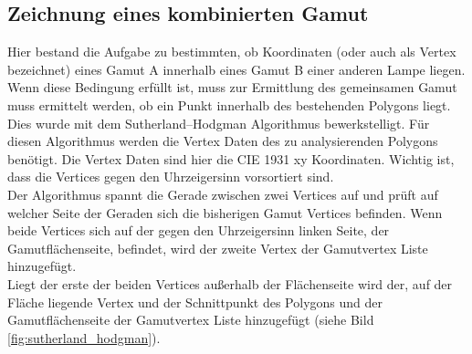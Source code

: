 \documentclass[11pt]{scrartcl}
\begin{document}
\subsection{Zeichnung eines kombinierten Gamut}
Hier bestand die Aufgabe zu bestimmten, ob Koordinaten (oder auch als Vertex bezeichnet) eines Gamut A innerhalb eines Gamut B einer anderen Lampe liegen. Wenn diese
Bedingung erfüllt ist, muss zur Ermittlung des gemeinsamen Gamut muss ermittelt werden, ob ein Punkt innerhalb des bestehenden Polygons liegt. Dies wurde mit dem
Sutherland–Hodgman Algorithmus \cite{sutherlandHodgman} bewerkstelligt. Für diesen Algorithmus werden die Vertex Daten des zu analysierenden Polygons benötigt. Die
Vertex Daten sind hier die CIE 1931 xy Koordinaten. Wichtig ist, dass die Vertices gegen den Uhrzeigersinn vorsortiert sind.\\
Der Algorithmus spannt die Gerade zwischen zwei Vertices auf und prüft auf welcher Seite der Geraden sich die bisherigen Gamut Vertices befinden. Wenn beide Vertices
sich auf der gegen den Uhrzeigersinn linken Seite, der Gamutflächenseite, befindet, wird der zweite Vertex der Gamutvertex Liste hinzugefügt.\\
Liegt der erste der beiden Vertices außerhalb der Flächenseite wird der, auf der Fläche liegende Vertex und der Schnittpunkt des Polygons und der Gamutflächenseite der
Gamutvertex Liste hinzugefügt (siehe Bild \ref{fig:sutherland_hodgman}).
\end{document}
